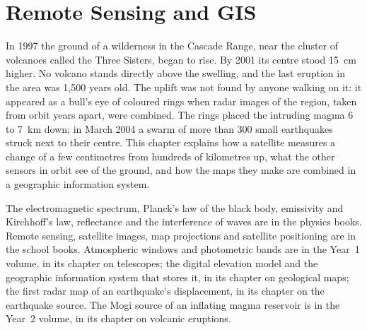 \chapter{Remote Sensing and GIS}\label{ch:b3:remote-sensing-gis}

In 1997 the ground of a wilderness in the Cascade Range, near the cluster of
volcanoes called the Three Sisters, began to rise. By 2001 its centre stood
\qty{15}{cm} higher. No volcano stands directly above the swelling, and the
last eruption in the area was 1,500 years old. The uplift was not found by
anyone walking on it: it appeared as a bull's eye of coloured rings when
radar images of the region, taken from orbit years apart, were combined.
The rings placed the intruding magma 6 to \qty{7}{km} down; in March 2004
a swarm of more than 300 small earthquakes struck next to their centre.
This chapter explains how a satellite measures a change of a few
centimetres from hundreds of kilometres up, what the other sensors in orbit
see of the ground, and how the maps they make are combined in a geographic
information system.

\begin{recall}
The electromagnetic spectrum, Planck's law of the black body, emissivity
and Kirchhoff's law, reflectance and the interference of waves are in the
physics books. Remote sensing, satellite images, map projections and
satellite positioning are in the school books. Atmospheric windows and
photometric bands are in the Year~1 volume, in its chapter on telescopes;
the digital elevation model and the geographic information system that
stores it, in its chapter on geological maps; the first radar map of an
earthquake's displacement, in its chapter on the earthquake source. The
Mogi source of an inflating magma reservoir is in the Year~2 volume, in its
chapter on volcanic eruptions.
\end{recall}

